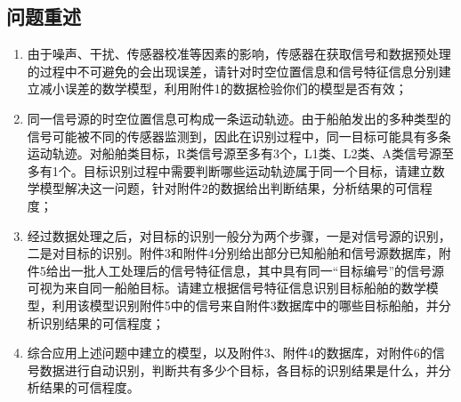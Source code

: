 \subsection{问题重述}
\begin{enumerate}
	\item 由于噪声、干扰、传感器校准等因素的影响，传感器在获取信号和数据预处理的过程中不可避免的会出现误差，请针对时空位置信息和信号特征信息分别建立减小误差的数学模型，利用附件1的数据检验你们的模型是否有效；
	\item 同一信号源的时空位置信息可构成一条运动轨迹。由于船舶发出的多种类型的信号可能被不同的传感器监测到，因此在识别过程中，同一目标可能具有多条运动轨迹。对船舶类目标，R类信号源至多有3个，L1类、L2类、A类信号源至多有1个。目标识别过程中需要判断哪些运动轨迹属于同一个目标，请建立数学模型解决这一问题，针对附件2的数据给出判断结果，分析结果的可信程度；
	\item 经过数据处理之后，对目标的识别一般分为两个步骤，一是对信号源的识别，二是对目标的识别。附件3和附件4分别给出部分已知船舶和信号源数据库，附件5给出一批人工处理后的信号特征信息，其中具有同一“目标编号”的信号源可视为来自同一船舶目标。请建立根据信号特征信息识别目标船舶的数学模型，利用该模型识别附件5中的信号来自附件3数据库中的哪些目标船舶，并分析识别结果的可信程度；
	\item 综合应用上述问题中建立的模型，以及附件3、附件4的数据库，对附件6的信号数据进行自动识别，判断共有多少个目标，各目标的识别结果是什么，并分析结果的可信程度。
\end{enumerate}
